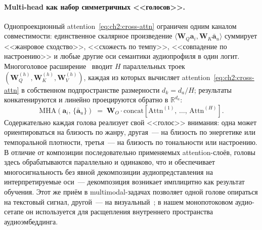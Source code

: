 \paragraph{Multi-head как набор симметричных <<голосов>>.} Однопроекционный attention~\eqref{eq:ch2:cross-attn} ограничен одним каналом совместимости: единственное скалярное произведение $\langle \mathbf{W}_Q \mathbf{a}_i, \mathbf{W}_K \bar{\mathbf{a}}_u \rangle$ суммирует <<жанровое сходство>>, <<схожесть по темпу>>, <<совпадение по настроению>> и любые другие оси семантики аудиопрофиля в один логит. Многоголовое расширение~\cite{vaswani2017attention} вводит $H$ параллельных троек $(\mathbf{W}_Q^{(h)}, \mathbf{W}_K^{(h)}, \mathbf{W}_V^{(h)})$, каждая из которых вычисляет attention~\eqref{eq:ch2:cross-attn} в собственном подпространстве размерности $d_k = d_a / H$; результаты конкатенируются и линейно проецируются обратно в $\mathbb{R}^{d_a}$:
\begin{equation*}
    \mathrm{MHA}\!\left(\mathbf{a}_i,\, \{\bar{\mathbf{a}}_u\}\right)
    \;=\;
    \mathbf{W}_O \cdot
    \mathrm{concat}\!\left[
        \mathrm{Attn}^{(1)},\, \ldots,\, \mathrm{Attn}^{(H)}
    \right].
\end{equation*}
Содержательно каждая голова реализует свой <<голос>> внимания: одна может ориентироваться на близость по жанру, другая~--- на близость по энергетике или темпоральной плотности, третья~--- на близость по тональности или настроению. В отличие от композиции последовательно применяемых attention-слоёв, головы здесь обрабатываются параллельно и одинаково, что и обеспечивает многосигнальность без явной декомпозиции аудиопредставления на интерпретируемые оси~--- декомпозиция возникает имплицитно как результат обучения. Этот же приём в multimodal-задачах позволяет одной голове опираться на текстовый сигнал, другой~--- на визуальный~\cite{vaswani2017attention}; в нашем монопотоковом аудио-сетапе он используется для расщепления внутреннего пространства аудиоэмбеддинга.

